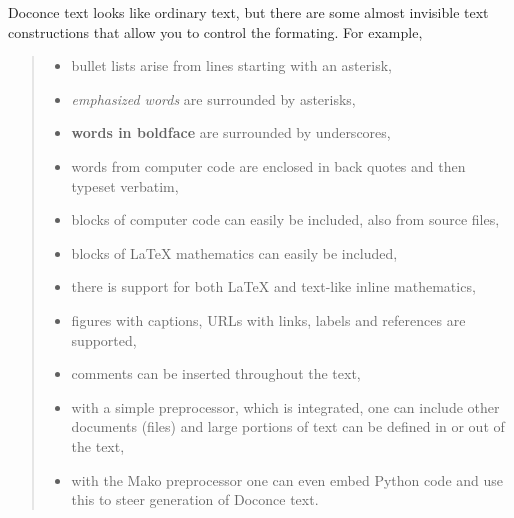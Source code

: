 \documentclass[a4paper,english]{article}
\begin{document}
Doconce text looks like ordinary text, but there are some almost invisible
text constructions that allow you to control the formating. For example,
%
\begin{quote}
%
\begin{itemize}

\item bullet lists arise from lines starting with an asterisk,

\item \emph{emphasized words} are surrounded by asterisks,

\item \textbf{words in boldface} are surrounded by underscores,

\item words from computer code are enclosed in back quotes and
then typeset verbatim,

\item blocks of computer code can easily be included, also from source files,

\item blocks of LaTeX mathematics can easily be included,

\item there is support for both LaTeX and text-like inline mathematics,

\item figures with captions, URLs with links, labels and references
are supported,

\item comments can be inserted throughout the text,

\item with a simple preprocessor, which is integrated, one can include
other documents (files) and large portions of text can be defined
in or out of the text,

\item with the Mako preprocessor one can even embed Python
code and use this to steer generation of Doconce text.

\end{itemize}

\end{quote}
\end{document}
